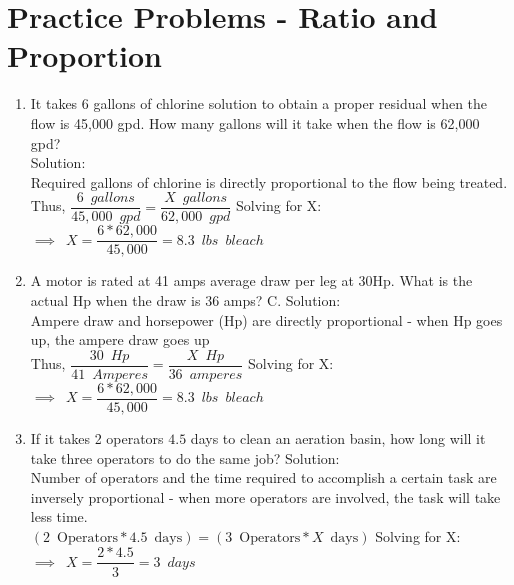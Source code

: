\section*{Practice Problems - Ratio and Proportion}

\begin{enumerate}
\item It takes 6 gallons of chlorine solution to obtain a proper residual when the flow is 45,000 gpd. How many gallons will it take when the flow is 62,000 gpd?\\
\vspace{0.2cm}
Solution:\\
\vspace{0.2cm}
Required gallons of chlorine is directly proportional to the flow being treated.\\
\vspace{0.2cm}
Thus, $\dfrac{6 \enspace gallons}{45,000 \enspace gpd }=\dfrac{X \enspace gallons}{62,000 \enspace gpd}$
\vspace{0.2cm}
Solving for X:\\
\vspace{0.2cm}
$\implies \enspace X=\dfrac{6*62,000}{45,000}=\boxed{8.3 \enspace lbs \enspace bleach}$
\vspace{0.2cm}

\item A motor is rated at 41 amps average draw per leg at $30 \mathrm{Hp}$. What is the actual $\mathrm{Hp}$ when the draw is 36 amps? C. 
\vspace{0.2cm}
Solution:\\
\vspace{0.2cm}
Ampere draw and horsepower (Hp) are directly proportional - when Hp goes up, the ampere draw goes up\\
\vspace{0.2cm}
Thus, $\dfrac{30 \enspace Hp}{41 \enspace Amperes }=\dfrac{X \enspace Hp}{36 \enspace amperes}$
\vspace{0.2cm}
Solving for X:\\
\vspace{0.2cm}
$\implies \enspace X=\dfrac{6*62,000}{45,000}=\boxed{8.3 \enspace lbs \enspace bleach}$
\vspace{0.2cm}
\item If it takes 2 operators $4.5$ days to clean an aeration basin, how long will it take three operators to do the same job?
\vspace{0.2cm}
Solution:\\
\vspace{0.2cm}
Number of operators and the time required to accomplish a certain task are inversely proportional - when more operators are involved, the task will take less time.\\
\vspace{0.2cm}
$(2 \enspace \mathrm{Operators} * 4.5 \enspace \mathrm{days})=(3 \enspace \mathrm{Operators} * X \enspace \mathrm{days})$
\vspace{0.2cm}
Solving for X:\\
\vspace{0.2cm}
$\implies \enspace X=\dfrac{2*4.5}{3}=\boxed{3 \enspace days}$
\vspace{0.2cm}
\end{enumerate}
